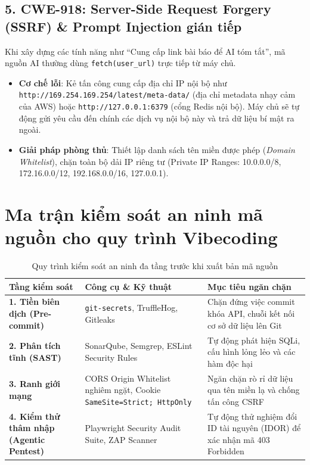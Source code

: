 \documentclass[a4paper,11pt]{article}
\begin{document}
\subsection{5. CWE-918: Server-Side Request Forgery (SSRF) \& Prompt Injection gián tiếp}
Khi xây dựng các tính năng như ``Cung cấp link bài báo để AI tóm tắt'', mã nguồn AI thường dùng \texttt{fetch(user\_url)} trực tiếp từ máy chủ.
\begin{itemize}[leftmargin=1.5em]
    \item \textbf{Cơ chế lỗi}: Kẻ tấn công cung cấp địa chỉ IP nội bộ như \texttt{http://169.254.169.254/latest/meta-data/} (địa chỉ metadata nhạy cảm của AWS) hoặc \texttt{http://127.0.0.1:6379} (cổng Redis nội bộ). Máy chủ sẽ tự động gửi yêu cầu đến chính các dịch vụ nội bộ này và trả dữ liệu bí mật ra ngoài.
    \item \textbf{Giải pháp phòng thủ}: Thiết lập danh sách tên miền được phép (\textit{Domain Whitelist}), chặn toàn bộ dải IP riêng tư (Private IP Ranges: 10.0.0.0/8, 172.16.0.0/12, 192.168.0.0/16, 127.0.0.1).
\end{itemize}

\section{Ma trận kiểm soát an ninh mã nguồn cho quy trình Vibecoding}

\begin{table}[htbp]
\centering
\small
\caption{Quy trình kiểm soát an ninh đa tầng trước khi xuất bản mã nguồn}
\vspace{0.5em}
\begin{tabularx}{\textwidth}{L{3cm} L{5cm} Y}
\toprule
\textbf{Tầng kiểm soát} & \textbf{Công cụ \& Kỹ thuật} & \textbf{Mục tiêu ngăn chặn} \\
\midrule
\textbf{1. Tiền biên dịch (Pre-commit)} & \texttt{git-secrets}, TruffleHog, Gitleaks & Chặn đứng việc commit khóa API, chuỗi kết nối cơ sở dữ liệu lên Git \\
\textbf{2. Phân tích tĩnh (SAST)} & SonarQube, Semgrep, ESLint Security Rules & Tự động phát hiện SQLi, cấu hình lỏng lẻo và các hàm độc hại \\
\textbf{3. Ranh giới mạng} & CORS Origin Whitelist nghiêm ngặt, Cookie \texttt{SameSite=Strict; HttpOnly} & Ngăn chặn rò rỉ dữ liệu qua tên miền lạ và chống tấn công CSRF \\
\textbf{4. Kiểm thử thâm nhập (Agentic Pentest)} & Playwright Security Audit Suite, ZAP Scanner & Tự động thử nghiệm đổi ID tài nguyên (IDOR) để xác nhận mã 403 Forbidden \\
\bottomrule
\end{tabularx}
\end{table}
\end{document}
